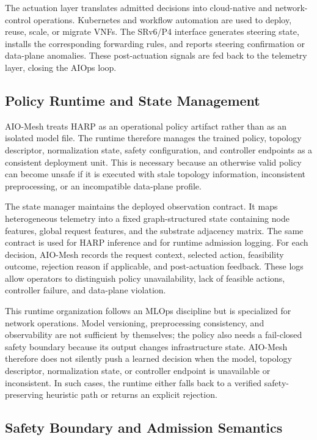 \documentclass[final,5p]{elsarticle}
\begin{document}
The actuation layer translates admitted decisions into cloud-native and network-control operations. Kubernetes and workflow automation are used to deploy, reuse, scale, or migrate VNFs. The SRv6/P4 interface generates steering state, installs the corresponding forwarding rules, and reports steering confirmation or data-plane anomalies. These post-actuation signals are fed back to the telemetry layer, closing the AIOps loop.

\subsection{Policy Runtime and State Management}
\label{subsec:policy_runtime}

AIO-Mesh treats HARP as an operational policy artifact rather than as an isolated model file. The runtime therefore manages the trained policy, topology descriptor, normalization state, safety configuration, and controller endpoints as a consistent deployment unit. This is necessary because an otherwise valid policy can become unsafe if it is executed with stale topology information, inconsistent preprocessing, or an incompatible data-plane profile.

The state manager maintains the deployed observation contract. It maps heterogeneous telemetry into a fixed graph-structured state containing node features, global request features, and the substrate adjacency matrix. The same contract is used for HARP inference and for runtime admission logging. For each decision, AIO-Mesh records the request context, selected action, feasibility outcome, rejection reason if applicable, and post-actuation feedback. These logs allow operators to distinguish policy unavailability, lack of feasible actions, controller failure, and data-plane violation.

This runtime organization follows an MLOps discipline but is specialized for network operations. Model versioning, preprocessing consistency, and observability are not sufficient by themselves; the policy also needs a fail-closed safety boundary because its output changes infrastructure state. AIO-Mesh therefore does not silently push a learned decision when the model, topology descriptor, normalization state, or controller endpoint is unavailable or inconsistent. In such cases, the runtime either falls back to a verified safety-preserving heuristic path or returns an explicit rejection.

\subsection{Safety Boundary and Admission Semantics}
\label{subsec:safety_boundary}
\end{document}
